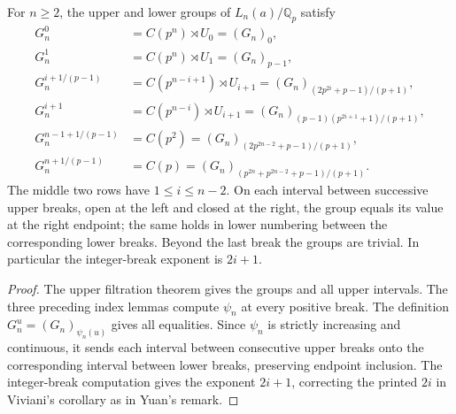 \begin{theorem}
\label{ft:finite-ramification}
\leanok{}
For $n\geq2$, the upper and lower groups of $L_n(a)/\mathbb Q_p$ satisfy
\[
\begin{aligned}
 G_n^0&=C(p^n)\rtimes U_0=(G_n)_0,\\
 G_n^1&=C(p^n)\rtimes U_1=(G_n)_{p-1},\\
 G_n^{i+1/(p-1)}&=C(p^{n-i+1})\rtimes U_{i+1}
       =(G_n)_{(2p^{2i}+p-1)/(p+1)},\\
 G_n^{i+1}&=C(p^{n-i})\rtimes U_{i+1}
       =(G_n)_{(p-1)(p^{2i+1}+1)/(p+1)},\\
 G_n^{n-1+1/(p-1)}&=C(p^2)
       =(G_n)_{(2p^{2n-2}+p-1)/(p+1)},\\
 G_n^{n+1/(p-1)}&=C(p)
       =(G_n)_{(p^{2n}+p^{2n-2}+p-1)/(p+1)}.
\end{aligned}
\]
The middle two rows have $1\leq i\leq n-2$. On each interval between
successive upper breaks, open at the left and closed at the right, the
group equals its value at the right endpoint; the same holds in lower
numbering between the corresponding lower breaks. Beyond the last break
the groups are trivial. In particular the integer-break exponent is
$2i+1$.
\end{theorem}
\begin{proof}
The upper filtration theorem gives the groups and all upper intervals.
The three preceding index lemmas compute $\psi_n$ at every positive
break. The definition $G_n^u=(G_n)_{\psi_n(u)}$ gives all equalities.
Since $\psi_n$ is strictly increasing and continuous, it sends each
interval between consecutive upper breaks onto the corresponding
interval between lower breaks, preserving endpoint inclusion. The
integer-break computation gives the exponent $2i+1$, correcting the
printed $2i$ in Viviani's corollary as in Yuan's remark.
\end{proof}

